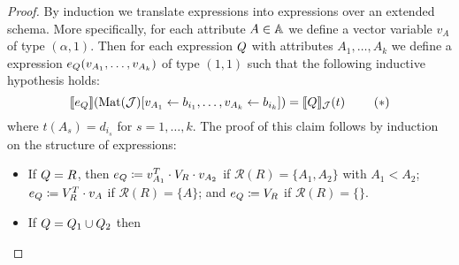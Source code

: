 
\newcommand{\earae}{e_{\arae}}

\begin{proof}	
By induction we translate \rak expressions into \langsum expressions over an extended schema. More specifically, for each attribute $A \in \mathbb{A}$ we define a vector variable $v_A$ of type $(\alpha,1)$. Then for each \rak expression $Q$ with attributes $A_1, \ldots, A_k$ we define a \langsum expression $\earae(v_{A_1}, \ldots, v_{A_k})$ of type $(1,1)$ such that the following inductive hypothesis holds:
$$
\sem{\earae}{\text{Mat}(\cJ)[v_{A_1} \gets b_{i_1},\ldots, v_{A_k} \gets b_{i_k}]} = 
\ssem{\arae}{\cJ}(t) \ \ \ \ \ \ \  (*)
$$
where $t(A_s)=d_{i_s}$ for $s=1,\ldots, k$. The proof of this claim follows by induction on the structure of expressions:
\begin{itemize} \itemsep3mm
	\item If $Q=R$, then $\earae\coloneqq v_{A_1}^T \cdot V_R \cdot v_{A_2}$ if $\mathcal{R}(R)=\{A_1,A_2\}$ with $A_1<A_2$; 
	$\earae\coloneqq V_R^T \cdot v_A$ if $\mathcal{R}(R)=\{A\}$; and 
	$\earae\coloneqq V_R$ if $\mathcal{R}(R)=\{\}$.
	\item If $Q=Q_1\cup Q_2$ then

\end{itemize}
\end{proof}
